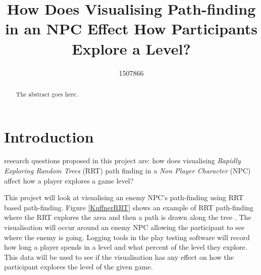 \documentclass[journal]{IEEEtran}
\begin{document}
%
\title{ How Does Visualising Path-finding in an NPC Effect How Participants Explore a Level?}
%
%
\author{1507866}


\maketitle

\begin{abstract}
The abstract goes here.
\end{abstract}

\section{Introduction}
% 
% 
% 
% 
 research questions proposed in this project are: how does visualising \textit{Rapidly Exploring Random Trees} (RRT) path finding in a \textit{Non Player Character} (NPC) affect how a player explores a game level?

This project will look at visualising an enemy NPC's path-finding using RRT based path-finding. Figure \ref{KuffnerRRT} shows an example of RRT path-finding where the RRT explores the area and then a path is drawn along the tree \cite{Kuffner2000}.  The visualisation will occur around an enemy NPC allowing the participant to see where the enemy is going. Logging tools in the play testing software will record how long a player spends in a level and what percent of the level they explore. This data will be used to see if the visualisation has any effect on how the participant explores the level of the given game. 
\end{document}

